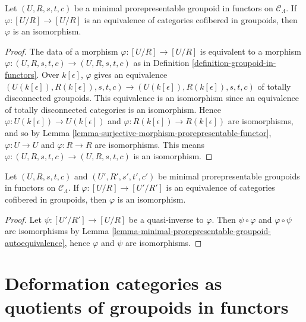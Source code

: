\begin{lemma}
\label{lemma-minimal-prorepresentable-groupoid-autoequivalence}
Let $(U,R,s,t,c)$ be a minimal prorepresentable groupoid in functors on 
$\mathcal{C}_\Lambda$.  If $\varphi: [U/R] \to [U/R]$ is an 
equivalence of categories cofibered in groupoids, then $\varphi$ is an 
isomorphism.
\end{lemma}

\begin{proof}
The data of a morphism $\varphi: [U/R] \to [U/R]$ is equivalent to a 
morphism $\varphi: (U,R,s,t,c) \to (U,R,s,t,c)$ as in Definition 
\ref{definition-groupoid-in-functors}.  Over $k[\epsilon]$, $\varphi$ gives 
an equivalence $(U(k[\epsilon]),R(k[\epsilon]), s,t,c) \to 
(U(k[\epsilon]),R(k[\epsilon]), s,t,c)$ of totally disconnected 
groupoids.  This equivalence is an isomorphism since an equivalence of totally 
disconnected categories is an isomorphism. Hence $\varphi: U(k[\epsilon]) 
\to U(k[\epsilon])$ and $\varphi: R(k[\epsilon]) \to 
R(k[\epsilon])$ are isomorphisms, and so by Lemma 
\ref{lemma-surjective-morphism-prorepresentable-functor}, $\varphi: U 
\to U$ and $\varphi: R \to R$ are isomorphisms.  This means 
$\varphi: (U,R,s,t,c) \to (U,R,s,t,c)$ is an isomorphism.
\end{proof}

\begin{lemma}
\label{lemma-minimal-prorepresentable-groupoid-equivalence}
Let $(U,R,s,t,c)$ and $(U',R',s',t',c')$ be minimal prorepresentable groupoids 
in functors on $\mathcal{C}_\Lambda$.  If $\varphi: [U/R] \to [U'/R']$ 
is an equivalence of categories cofibered in groupoids, then $\varphi$ is an 
isomorphism. 
\end{lemma}

\begin{proof}
Let $\psi: [U'/R'] \to [U/R]$ be a quasi-inverse to $\varphi$.  Then 
$\psi \circ \varphi$ and $\varphi \circ \psi$ are isomorphisms by Lemma 
\ref{lemma-minimal-prorepresentable-groupoid-autoequivalence}, hence $\varphi$ 
and $\psi$ are isomorphisms.
\end{proof}





\section{Deformation categories as quotients of groupoids in functors}
\label{section-deformation-categories-as-quotients}

